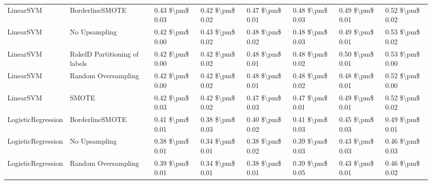 \begin{tabular}{llllllll}
                      LinearSVM &               BorderlineSMOTE & 0.43 \$\textbackslash pm\$ 0.03 &           0.42 \$\textbackslash pm\$ 0.02 &       0.47 \$\textbackslash pm\$ 0.01 &        0.48 \$\textbackslash pm\$ 0.03 &                         0.49 \$\textbackslash pm\$ 0.01 &     0.52 \$\textbackslash pm\$ 0.02 \\
                      LinearSVM &                 No Upsampling & 0.42 \$\textbackslash pm\$ 0.00 &           0.43 \$\textbackslash pm\$ 0.02 &       0.48 \$\textbackslash pm\$ 0.02 &        0.48 \$\textbackslash pm\$ 0.03 &                         0.49 \$\textbackslash pm\$ 0.01 &     0.53 \$\textbackslash pm\$ 0.02 \\
                      LinearSVM & RakelD Partitioning of labels & 0.42 \$\textbackslash pm\$ 0.00 &           0.42 \$\textbackslash pm\$ 0.02 &       0.48 \$\textbackslash pm\$ 0.01 &        0.48 \$\textbackslash pm\$ 0.02 &                         0.50 \$\textbackslash pm\$ 0.01 &     0.53 \$\textbackslash pm\$ 0.00 \\
                      LinearSVM &           Random Oversampling & 0.42 \$\textbackslash pm\$ 0.00 &           0.42 \$\textbackslash pm\$ 0.02 &       0.48 \$\textbackslash pm\$ 0.01 &        0.48 \$\textbackslash pm\$ 0.02 &                         0.48 \$\textbackslash pm\$ 0.01 &     0.52 \$\textbackslash pm\$ 0.00 \\
                      LinearSVM &                         SMOTE & 0.42 \$\textbackslash pm\$ 0.03 &           0.42 \$\textbackslash pm\$ 0.02 &       0.47 \$\textbackslash pm\$ 0.03 &        0.47 \$\textbackslash pm\$ 0.01 &                         0.49 \$\textbackslash pm\$ 0.01 &     0.52 \$\textbackslash pm\$ 0.02 \\
             LogisticRegression &               BorderlineSMOTE & 0.41 \$\textbackslash pm\$ 0.01 &           0.38 \$\textbackslash pm\$ 0.03 &       0.40 \$\textbackslash pm\$ 0.02 &        0.41 \$\textbackslash pm\$ 0.03 &                         0.45 \$\textbackslash pm\$ 0.03 &     0.49 \$\textbackslash pm\$ 0.01 \\
             LogisticRegression &                 No Upsampling & 0.38 \$\textbackslash pm\$ 0.01 &           0.34 \$\textbackslash pm\$ 0.01 &       0.38 \$\textbackslash pm\$ 0.02 &        0.39 \$\textbackslash pm\$ 0.03 &                         0.43 \$\textbackslash pm\$ 0.03 &     0.46 \$\textbackslash pm\$ 0.03 \\
             LogisticRegression &           Random Oversampling & 0.39 \$\textbackslash pm\$ 0.01 &           0.34 \$\textbackslash pm\$ 0.01 &       0.38 \$\textbackslash pm\$ 0.01 &        0.39 \$\textbackslash pm\$ 0.05 &                         0.43 \$\textbackslash pm\$ 0.01 &     0.46 \$\textbackslash pm\$ 0.02 \\

\end{tabular}

